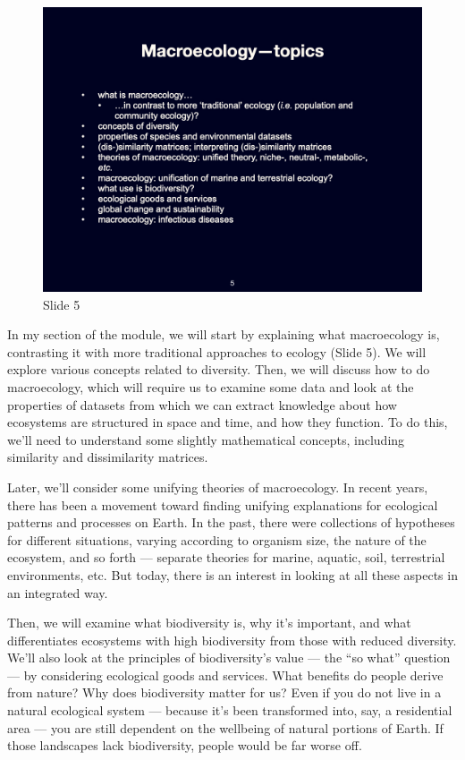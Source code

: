 \documentclass[
  11pt,
]{book}
\begin{document}
\begin{figure}[ht]
\centering
\includegraphics[width=0.8\linewidth]{../images/BDC334/BDC334-005.jpeg}
\caption*{Slide 5}
\end{figure}

In my section of the module, we will start by explaining what
macroecology is, contrasting it with more traditional approaches to
ecology (Slide 5). We will explore various concepts related to
diversity. Then, we will discuss how to do macroecology, which will
require us to examine some data and look at the properties of datasets
from which we can extract knowledge about how ecosystems are structured
in space and time, and how they function. To do this, we'll need to
understand some slightly mathematical concepts, including similarity and
dissimilarity matrices.

Later, we'll consider some unifying theories of macroecology. In recent
years, there has been a movement toward finding unifying explanations
for ecological patterns and processes on Earth. In the past, there were
collections of hypotheses for different situations, varying according to
organism size, the nature of the ecosystem, and so forth --- separate
theories for marine, aquatic, soil, terrestrial environments, etc. But
today, there is an interest in looking at all these aspects in an
integrated way.

Then, we will examine what biodiversity is, why it's important, and what
differentiates ecosystems with high biodiversity from those with reduced
diversity. We'll also look at the principles of biodiversity's value ---
the ``so what'' question --- by considering ecological goods and
services. What benefits do people derive from nature? Why does
biodiversity matter for us? Even if you do not live in a natural
ecological system --- because it's been transformed into, say, a
residential area --- you are still dependent on the wellbeing of natural
portions of Earth. If those landscapes lack biodiversity, people would
be far worse off.
\end{document}
